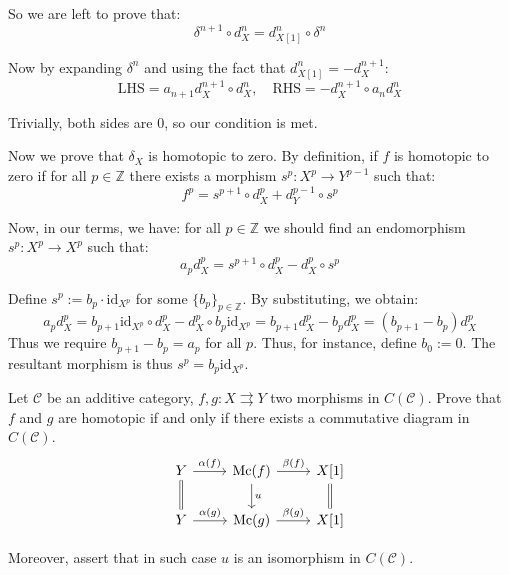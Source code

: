 \documentclass{category-template}
\begin{document}
So we are left to prove that:
\begin{equation*}
    \delta^{n+1} \circ d_X^n = d_{X[1]}^n \circ \delta^n
\end{equation*}

Now by expanding $\delta^n$ and using the fact that $d_{X[1]}^n = -d_X^{n+1}$:
\begin{equation*}
    \text{LHS} = a_{n+1}d_X^{n+1} \circ d_X^n, \quad \text{RHS} = -d_X^{n+1} \circ a_n d_X^n
\end{equation*}

Trivially, both sides are 0, so our condition is met.

Now we prove that $\delta_X$ is homotopic to zero. By definition, if $f$ is
homotopic to zero if for all $p \in \mathbb{Z}$ there exists a morphism $s^p:
X^p \to Y^{p-1}$ such that:
\begin{equation*}
    f^p = s^{p+1} \circ d_X^p + d_Y^{p-1} \circ s^p
\end{equation*}

Now, in our terms, we have: for all $p \in \mathbb{Z}$ we should find an 
endomorphism $s^p: X^p \to X^p$ such that:
\begin{equation*}
    a_pd_X^p = s^{p+1} \circ d_X^p - d_X^p \circ s^p
\end{equation*}

Define $s^p := b_p \cdot \text{id}_{X^p}$ for some $\{b_p\}_{p \in \mathbb{Z}}$. By 
substituting, we obtain:
\begin{equation*}
    a_pd_X^p = b_{p+1} \text{id}_{X^p} \circ d_X^p - d_X^p \circ b_p \text{id}_{X^p}
    = b_{p+1}d_X^p - b_pd_X^p = (b_{p+1}-b_p)d_X^p
\end{equation*}
Thus we require $b_{p+1}-b_p=a_p$ for all $p$. Thus, for instance, define 
$b_0 := 0$. The resultant morphism is thus $s^p = b_p\text{id}_{X^p}$.

\begin{problem}
    Let $\mathcal{C}$ be an additive category, $f,g: X \rightrightarrows Y$
    two morphisms in $C(\mathcal{C})$. Prove that $f$ and $g$ are homotopic 
    if and only if there exists a commutative diagram in $C(\mathcal{C})$.
\[
\begin{tikzcd}
    Y \arrow{r}{\alpha(f)} \arrow[equal]{d}{} & {\text{Mc}(f)} \arrow{r}{\beta(f)} \arrow{d}{u} & X[1] \arrow[equal]{d}{} \\
	Y \arrow{r}{\alpha(g)} & \text{Mc}(g) \arrow{r}{\beta(g)} & X[1]
\end{tikzcd}
\]

Moreover, assert that in such case $u$ is an isomorphism in $C(\mathcal{C})$.
\end{problem}
\end{document}
